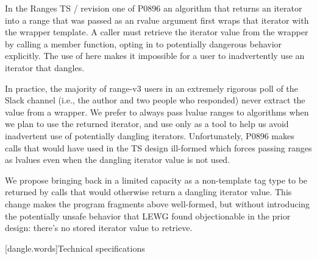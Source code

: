 In the Ranges TS / revision one of P0896 an algorithm that returns an iterator
into a range that was passed as an rvalue argument first wraps that iterator
with the  wrapper template. A caller must retrieve the iterator
value from the wrapper by calling a member function, opting in to potentially
dangerous behavior explicitly. The use of  here makes it
impossible for a user to inadvertently use an iterator that dangles.

In practice, the majority of range-v3 users in an extremely rigorous poll of the
 Slack channel (i.e., the author and two people who responded)
never extract the value from a  wrapper. We prefer to always
pass lvalue ranges to algorithms when we plan to use the returned iterator, and
use  only as a tool to help us avoid inadvertent use of
potentially dangling iterators. Unfortunately, P0896 makes calls that would have
used  in the TS design ill-formed which forces passing ranges
as lvalues even when the dangling iterator value is not used.

We propose bringing back  in a limited capacity as a
non-template tag type to be returned by calls that would otherwise return a
dangling iterator value. This change makes the program fragments above
well-formed, but without introducing the potentially unsafe behavior that LEWG
found objectionable in the prior  design: there's no stored
iterator value to retrieve.

[dangle.words]{Technical specifications}

